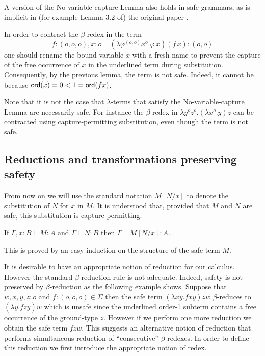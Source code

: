 \documentclass{llncs}
\newcommand\subst[2]{\left[ #1/#2 \right]}
\newcommand\ord[1]{{\sf
    ord}(#1)} \newcommand\typear{\rightarrow}
\begin{document}
\begin{remark}
  A version of the No-variable-capture Lemma also holds in safe
  grammars, as is implicit in (for example Lemma 3.2 of) the original
  paper \cite{KNU02}.
\end{remark}

\begin{example}
  In order to contract the $\beta$-redex in the term
\[f:(o,o,o),x:o
  \vdash (\lambda \varphi^{(o,o)} x^o . \varphi \, x) (\underline{f \,
    x}) : (o,o)\] one should rename the bound variable $x$ with a fresh name to
  prevent the capture of the free occurrence of $x$ in the underlined term during substitution. Consequently, by the previous lemma,
  the term is not safe. Indeed, it cannot be because $\ord{x} = 0 < 1
  = \ord{f x}$.
\end{example}

Note that it is not the case that $\lambda$-terms
that satisfy the No-variable-capture Lemma are necessarily safe. For instance the $\beta$-redex in $\lambda y^o
z^o. (\lambda x^o .y) z$ can be contracted using capture-permitting
substitution, even though the term is not safe.

\subsection*{Reductions and transformations preserving safety}

From now on we will use the standard notation $M\subst{N}{x}$ to
denote the substitution of $N$ for $x$ in $M$.  It is understood that,
provided that $M$ and $N$ are safe, this substitution is
capture-permitting.


\begin{lemma}
\label{lem:subst_preserve_safety}
If $\Gamma, x :B \vdash M : A$ and $\Gamma \vdash N : B$ then $\Gamma \vdash M[N/x] : A$.
\end{lemma}
This is proved by an easy induction on the structure of the safe term $M$.


It is desirable to have an appropriate notion of reduction for our
calculus. However the standard $\beta$-reduction rule is not
adequate. Indeed, safety is not preserved by $\beta$-reduction as the
following example shows. Suppose that $w,x,y,z : o$ and $f : (o,o,o)
\in \Sigma$ then the safe term $(\lambda x y . f x y) z w$
$\beta$-reduces to $(\underline{\lambda y . f z y}) w$ which is unsafe
since the underlined order-1 subterm contains a free occurrence of the
ground-type $z$. However if we perform one more reduction we obtain
the safe term $f z w$. This suggests an alternative notion of
reduction that performs simultaneous reduction of ``consecutive''
$\beta$-redexes. In order to define this reduction we first introduce
the appropriate notion of redex.
\end{document}
